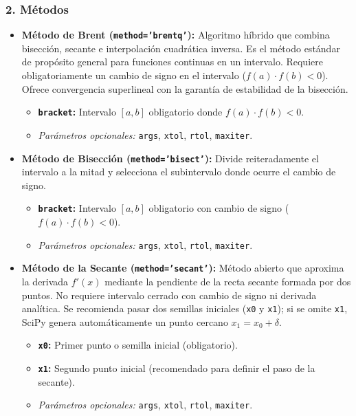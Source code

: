 \documentclass[12pt]{article}
\begin{document}
\begin{cajaflex}
\subsubsection*{\textcolor{teal!70!black}{2. Métodos}}

\begin{itemize}
    \item \textbf{Método de Brent (\texttt{method='brentq'}):}
    Algoritmo híbrido que combina bisección, secante e interpolación 
    cuadrática inversa. Es el método estándar de propósito general
    para funciones continuas en un intervalo.
    Requiere obligatoriamente 
    un cambio de signo en el intervalo ($f(a) \cdot f(b) < 0$). 
    Ofrece convergencia superlineal con la garantía de estabilidad de 
    la bisección.
   
    \begin{itemize}  
        \item \textbf{\texttt{bracket}:} Intervalo $[a, b]$ obligatorio donde $f(a) \cdot f(b) < 0$.
        \item \textit{Parámetros opcionales:} \texttt{args}, \texttt{xtol}, \texttt{rtol}, \texttt{maxiter}.
    \end{itemize}

    \item \textbf{Método de Bisección (\texttt{method='bisect'}):}
    Divide reiteradamente el intervalo a la mitad y selecciona el 
    subintervalo donde ocurre el cambio de signo.
    
    \begin{itemize}
        \item \textbf{\texttt{bracket}:} Intervalo $[a, b]$ obligatorio con cambio de signo ($f(a) \cdot f(b) < 0$).
        \item \textit{Parámetros opcionales:} \texttt{args}, \texttt{xtol}, \texttt{rtol}, \texttt{maxiter}.
    \end{itemize}

    \item \textbf{Método de la Secante (\texttt{method='secant'}):}
    Método abierto que aproxima la derivada $f'(x)$ mediante la 
    pendiente de la recta secante formada por dos puntos.
    No requiere intervalo cerrado con cambio de signo ni derivada 
    analítica. Se recomienda pasar dos semillas 
    iniciales (\texttt{x0} y \texttt{x1}); si se omite \texttt{x1}, 
    SciPy genera automáticamente un punto cercano $x_1 = x_0 + \delta$.
    \begin{itemize}
        \item \textbf{\texttt{x0}:} Primer punto o semilla inicial (obligatorio).
        \item \textbf{\texttt{x1}:} Segundo punto inicial (recomendado para definir el paso de la secante).
        \item \textit{Parámetros opcionales:} \texttt{args}, \texttt{xtol}, \texttt{rtol}, \texttt{maxiter}.
    \end{itemize}


\end{itemize}
\end{cajaflex}
\end{document}
